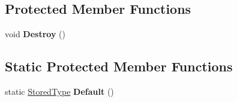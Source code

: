 \subsection*{Protected Member Functions}
\begin{DoxyCompactItemize}
\item 
\hypertarget{classLoki_1_1FunctionStorage_ac7f58b1c0640240fbe17c2f7bc148a7a}{}void {\bfseries Destroy} ()\label{classLoki_1_1FunctionStorage_ac7f58b1c0640240fbe17c2f7bc148a7a}

\end{DoxyCompactItemize}
\subsection*{Static Protected Member Functions}
\begin{DoxyCompactItemize}
\item 
\hypertarget{classLoki_1_1FunctionStorage_a0a7769b064aa2b15ef22338f8ca3b76c}{}static \hyperlink{classLoki_1_1FunctionStorage_a52a1fc18d9685e6496bde1078e6949c5}{Stored\+Type} {\bfseries Default} ()\label{classLoki_1_1FunctionStorage_a0a7769b064aa2b15ef22338f8ca3b76c}

\end{DoxyCompactItemize}
